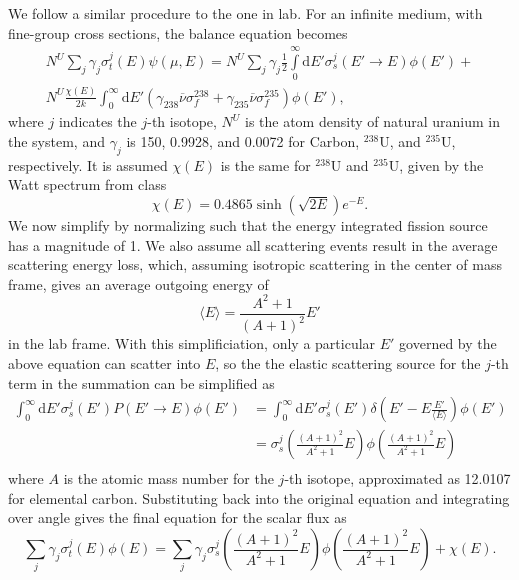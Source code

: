 \documentclass[12pt]{article}
\renewcommand{\d}{\mathrm{d}}
\newcommand{\ra}{\rightarrow}
\newenvironment{solnum}[2][Solution]{\begin{trivlist}
\item[\hskip \labelsep {\bfseries #1}\hskip \labelsep {\bfseries #2:}]\hspace{0.3in}\newline\newline}{\end{trivlist}}
\newcommand{\iso}[2]{\ensuremath{^{#2}\text{#1}}}
\newcommand{\nubar}{\ensuremath{\overline{\nu}}}
\begin{document}
\begin{solnum}{1}
We follow a similar procedure to the one in lab.  For an infinite medium, with
fine-group cross sections, the balance equation becomes
\begin{multline}
    N^{U}\sum_{j} \gamma_j \sigma_t^j(E) \psi(\mu,E) = N^{U}\sum_{j} \gamma_j
    \frac{1}{2} \int\limits_0^\infty \d E' \sigma_s^j (E'\ra E)\phi(E') + \\
    N^U\frac{\chi(E)}{2k} \int_0^\infty\d E' \left(\gamma_{238}\nubar\sigma_f^{238} +
    \gamma_{235}\nubar\sigma_f^{235}\right)\phi(E'),
\end{multline}
where $j$ indicates the $j$-th isotope, $N^U$ is the atom density of natural uranium
in the system, and $\gamma_j$ is 150, 0.9928, and 0.0072 for Carbon, \iso{U}{238},
and \iso{U}{235}, respectively.  It is assumed $\chi(E)$ is the same for \iso{U}{238}
and \iso{U}{235}, given by the Watt spectrum from class
\begin{equation}
    \chi(E) = 0.4865 \sinh(\sqrt{2E})e^{-E}.
\end{equation}
We now simplify by normalizing such that the energy integrated fission source has a
magnitude of 1.  We also assume all scattering events result in the average
scattering energy loss, which, assuming isotropic scattering in the center of mass
frame, gives an average outgoing energy of 
\begin{equation}
    \langle E\rangle = \frac{A^2 + 1}{(A+1)^2}E'
\end{equation}
in the lab frame.  With this simplificiation, only a particular $E'$ governed by the above equation can scatter
into $E$, so the the elastic scattering source for the $j$-th term in the summation can be simplified as
\begin{align}
    \int_0^\infty \d E' \sigma_s^j(E')P(E'\ra E)\phi(E') &= \int_0^\infty \d
    E'\sigma_s^j(E')\delta\left(E' - E \frac{E'}{\langle E \rangle}\right) \phi(E') \\
    &= \sigma_s^j\left(\frac{(A+1)^2}{A^2+1}E\right) \phi\left(\frac{(A+1)^2}{A^2+1}E\right) \\
\end{align}
where $A$ is the atomic mass number for the $j$-th isotope, approximated as 12.0107 for elemental carbon.
Substituting back into the original equation and integrating over angle gives the
final equation for the scalar flux as
\begin{equation}
    \sum_{j} \gamma_j \sigma_t^j(E) \phi(E) = \sum_{j} \gamma_j \sigma_s^j \left(\frac{(A+1)^2}{A^2+1}E\right) \phi\left(\frac{(A+1)^2}{A^2+1}E\right) 
   + {\chi(E)} .

\end{equation}
\end{solnum}
\end{document}
